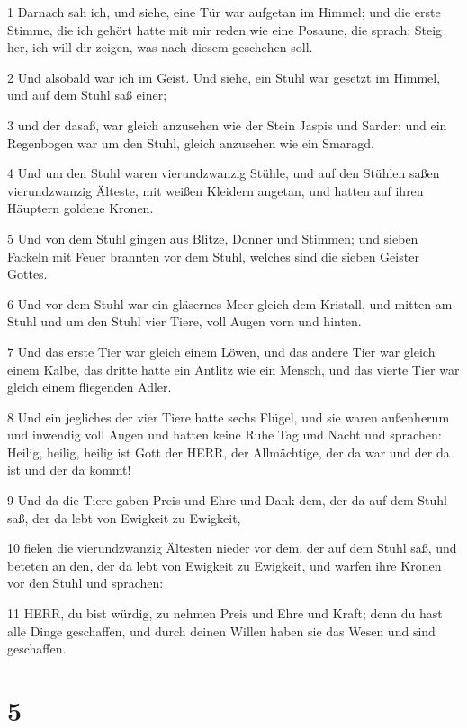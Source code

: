 \par 1 Darnach sah ich, und siehe, eine Tür war aufgetan im Himmel; und die erste Stimme, die ich gehört hatte mit mir reden wie eine Posaune, die sprach: Steig her, ich will dir zeigen, was nach diesem geschehen soll.
\par 2 Und alsobald war ich im Geist. Und siehe, ein Stuhl war gesetzt im Himmel, und auf dem Stuhl saß einer;
\par 3 und der dasaß, war gleich anzusehen wie der Stein Jaspis und Sarder; und ein Regenbogen war um den Stuhl, gleich anzusehen wie ein Smaragd.
\par 4 Und um den Stuhl waren vierundzwanzig Stühle, und auf den Stühlen saßen vierundzwanzig Älteste, mit weißen Kleidern angetan, und hatten auf ihren Häuptern goldene Kronen.
\par 5 Und von dem Stuhl gingen aus Blitze, Donner und Stimmen; und sieben Fackeln mit Feuer brannten vor dem Stuhl, welches sind die sieben Geister Gottes.
\par 6 Und vor dem Stuhl war ein gläsernes Meer gleich dem Kristall, und mitten am Stuhl und um den Stuhl vier Tiere, voll Augen vorn und hinten.
\par 7 Und das erste Tier war gleich einem Löwen, und das andere Tier war gleich einem Kalbe, das dritte hatte ein Antlitz wie ein Mensch, und das vierte Tier war gleich einem fliegenden Adler.
\par 8 Und ein jegliches der vier Tiere hatte sechs Flügel, und sie waren außenherum und inwendig voll Augen und hatten keine Ruhe Tag und Nacht und sprachen: Heilig, heilig, heilig ist Gott der HERR, der Allmächtige, der da war und der da ist und der da kommt!
\par 9 Und da die Tiere gaben Preis und Ehre und Dank dem, der da auf dem Stuhl saß, der da lebt von Ewigkeit zu Ewigkeit,
\par 10 fielen die vierundzwanzig Ältesten nieder vor dem, der auf dem Stuhl saß, und beteten an den, der da lebt von Ewigkeit zu Ewigkeit, und warfen ihre Kronen vor den Stuhl und sprachen:
\par 11 HERR, du bist würdig, zu nehmen Preis und Ehre und Kraft; denn du hast alle Dinge geschaffen, und durch deinen Willen haben sie das Wesen und sind geschaffen.

\chapter{5}


